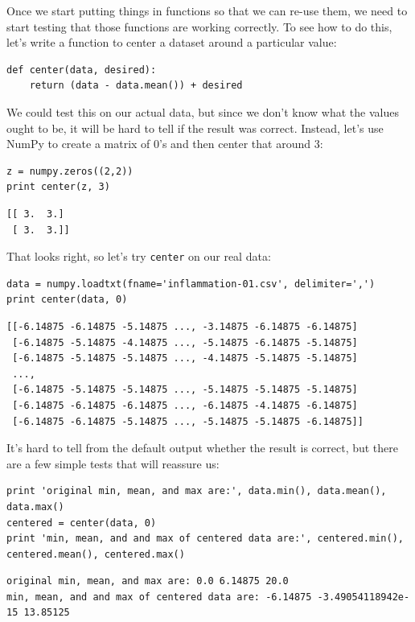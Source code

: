 \documentclass[]{book}
\begin{document}
Once we start putting things in functions so that we can re-use them, we
need to start testing that those functions are working correctly. To see
how to do this, let's write a function to center a dataset around a
particular value:

\begin{verbatim}
def center(data, desired):
    return (data - data.mean()) + desired
\end{verbatim}

We could test this on our actual data, but since we don't know what the
values ought to be, it will be hard to tell if the result was correct.
Instead, let's use NumPy to create a matrix of 0's and then center that
around 3:

\begin{verbatim}
z = numpy.zeros((2,2))
print center(z, 3)
\end{verbatim}

\begin{verbatim}
[[ 3.  3.]
 [ 3.  3.]]
\end{verbatim}

That looks right, so let's try \texttt{center} on our real data:

\begin{verbatim}
data = numpy.loadtxt(fname='inflammation-01.csv', delimiter=',')
print center(data, 0)
\end{verbatim}

\begin{verbatim}
[[-6.14875 -6.14875 -5.14875 ..., -3.14875 -6.14875 -6.14875]
 [-6.14875 -5.14875 -4.14875 ..., -5.14875 -6.14875 -5.14875]
 [-6.14875 -5.14875 -5.14875 ..., -4.14875 -5.14875 -5.14875]
 ...,
 [-6.14875 -5.14875 -5.14875 ..., -5.14875 -5.14875 -5.14875]
 [-6.14875 -6.14875 -6.14875 ..., -6.14875 -4.14875 -6.14875]
 [-6.14875 -6.14875 -5.14875 ..., -5.14875 -5.14875 -6.14875]]
\end{verbatim}

It's hard to tell from the default output whether the result is correct,
but there are a few simple tests that will reassure us:

\begin{verbatim}
print 'original min, mean, and max are:', data.min(), data.mean(), data.max()
centered = center(data, 0)
print 'min, mean, and and max of centered data are:', centered.min(), centered.mean(), centered.max()
\end{verbatim}

\begin{verbatim}
original min, mean, and max are: 0.0 6.14875 20.0
min, mean, and and max of centered data are: -6.14875 -3.49054118942e-15 13.85125
\end{verbatim}
\end{document}
